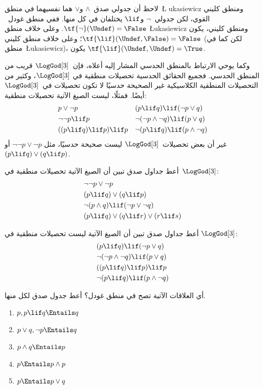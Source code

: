\documentclass[../../../include/open-logic-section]{subfiles}
\begin{document}
لاحظ أن جدولي صدق~$\land$ و$\lor$ هما نفسيهما في منطق~\L
ukasiewicz ومنطق كليني القوي، لكن جدولي~$\lnot$ و$\lif$ يختلفان في
كل منها. ففي منطق غودل~$\tf{\lnot}(\Undef) = \False$. وعلى خلاف منطق
\L ukasiewicz ومنطق كليني، يكون
$\tf{\lif}(\Undef, \False) = \False$؛ وعلى خلاف منطق كليني (لكن كما
في منطق~\L ukasiewicz)، يكون
$\tf{\lif}(\Undef, \Undef) = \True$.

وكما يوحي الارتباط بالمنطق الحدسي المشار إليه أعلاه، فإن~$\LogGod[3]$
قريب من المنطق الحدسي. فجميع الحقائق الحدسية تحصيلات منطقية في
$\LogGod[3]$، وكثير من التحصيلات المنطقية الكلاسيكية غير الصحيحة
حدسيًا لا تكون تحصيلات في~$\LogGod[3]$ أيضًا. فمثلًا، ليست الصيغ الآتية
تحصيلات منطقية:
\begin{align*}
  & p \lor \lnot p && (p \lif q) \lif (\lnot p \lor q) \\
  & \lnot\lnot p \lif p && \lnot(\lnot p \land \lnot q) \lif (p \lor q) \\
  & ((p \lif q) \lif p) \lif p && \lnot(p \lif q) \lif (p \land \lnot q)
\end{align*}
غير أن بعض تحصيلات~$\LogGod[3]$ ليست صحيحة حدسيًا، مثل
$\lnot\lnot p \lor \lnot p$ أو~$(p \lif q) \lor (q \lif p)$.

\begin{prob}
  أعط جداول صدق تبين أن الصيغ الآتية تحصيلات منطقية في~$\LogGod[3]$:
  \begin{align*}
    & \lnot\lnot p \lor \lnot p\\
    & (p \lif q) \lor (q \lif p) \\
    & \lnot(p \land q) \lif (\lnot p \lor \lnot q) \\
    & (p \lif q) \lor (q \lif r) \lor (r \lif s)
  \end{align*}
\end{prob}

\begin{prob}
  أعط جداول صدق تبين أن الصيغ الآتية ليست تحصيلات منطقية في
  $\LogGod[3]$:
  \begin{align*}
    & (p \lif q) \lif (\lnot p \lor q) \\
    & \lnot(\lnot p \land \lnot q) \lif (p \lor q) \\
    & ((p \lif q) \lif p) \lif p \\
    & \lnot(p \lif q) \lif (p \land \lnot q)
  \end{align*}
\end{prob}

\begin{prob}
  أي العلاقات الآتية تصح في منطق غودل؟ أعط جدول صدق لكل منها.
  \begin{enumerate}
    \item $p, p \lif q \Entails q$
    \item $p \lor q, \lnot p \Entails q$
    \item $p \land q \Entails p$
    \item $p \Entails p \land p$
    \item $p \Entails p \lor q$
  \end{enumerate}
\end{prob}
\end{document}
